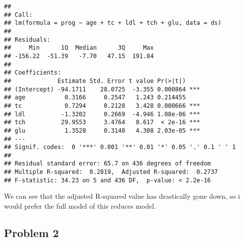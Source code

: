 \documentclass[
]{article}
\begin{document}
\begin{enumerate}
\begin{verbatim}
## 
## Call:
## lm(formula = prog ~ age + tc + ldl + tch + glu, data = ds)
## 
## Residuals:
##     Min      1Q  Median      3Q     Max 
## -156.22  -51.39   -7.70   47.15  191.84 
## 
## Coefficients:
##             Estimate Std. Error t value Pr(>|t|)    
## (Intercept) -94.1711    28.0725  -3.355 0.000864 ***
## age           0.3166     0.2547   1.243 0.214455    
## tc            0.7294     0.2128   3.428 0.000666 ***
## ldl          -1.3202     0.2669  -4.946 1.08e-06 ***
## tch          29.9553     3.4764   8.617  < 2e-16 ***
## glu           1.3528     0.3140   4.308 2.03e-05 ***
## ---
## Signif. codes:  0 '***' 0.001 '**' 0.01 '*' 0.05 '.' 0.1 ' ' 1
## 
## Residual standard error: 65.7 on 436 degrees of freedom
## Multiple R-squared:  0.2819,  Adjusted R-squared:  0.2737 
## F-statistic: 34.23 on 5 and 436 DF,  p-value: < 2.2e-16
\end{verbatim}

  We can see that the adjusted R-squared value has drastically gone
  down, so i would prefer the full model of this reduces model.
\end{enumerate}

\hypertarget{problem-2}{%
\subsection{Problem 2}\label{problem-2}}
\end{document}
